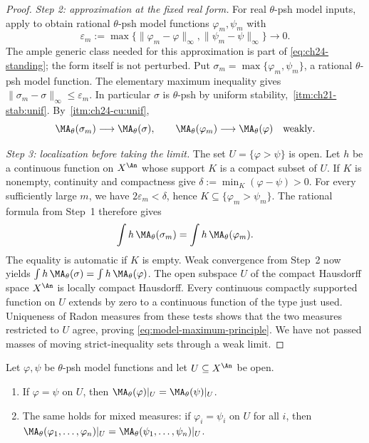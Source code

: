\begin{proof}
\emph{Step 2: approximation at the fixed real form.}
For real \(\theta\)-psh model inputs, apply
 to obtain rational
\(\theta\)-psh model functions \(\varphi_m,\psi_m\) with
\[
 \varepsilon_m:=\max\{\|\varphi_m-\varphi\|_\infty,
                         \|\psi_m-\psi\|_\infty\}\longrightarrow0.
\]
The ample generic class needed for this approximation is part of
\eqref{eq:ch24-standing}; the form itself is not perturbed.
Put \(\sigma_m=\max\{\varphi_m,\psi_m\}\), a rational
\(\theta\)-psh model function.  The elementary maximum inequality gives
\(\|\sigma_m-\sigma\|_\infty\leq\varepsilon_m\).
In particular \(\sigma\) is \(\theta\)-psh by uniform stability,
\,\cref{itm:ch21-stab:unif}.
By \,\cref{itm:ch24-cu:unif},
\[
 \MA_\theta(\sigma_m)\longrightarrow\MA_\theta(\sigma),
 \qquad
 \MA_\theta(\varphi_m)\longrightarrow\MA_\theta(\varphi)
 \quad\text{weakly}.
\]

\emph{Step 3: localization before taking the limit.}
The set \(U=\{\varphi>\psi\}\) is open.  Let \(h\) be a continuous
function on \(X^{\An}\) whose support \(K\) is a compact subset of
\(U\).  If \(K\) is nonempty, continuity and compactness give
\(\delta:=\min_K(\varphi-\psi)>0\).  For every sufficiently large
\(m\), we have \(2\varepsilon_m<\delta\), hence
\(K\subseteq\{\varphi_m>\psi_m\}\).  The rational formula from
Step~1 therefore gives
\[
 \int h\,\MA_\theta(\sigma_m)
       =\int h\,\MA_\theta(\varphi_m).
\]
The equality is automatic if \(K\) is empty.  Weak convergence from
Step~2 now yields
\(\int h\,\MA_\theta(\sigma)=\int h\,\MA_\theta(\varphi)\).
The open subspace \(U\) of the compact Hausdorff space \(X^{\An}\)
is locally compact Hausdorff.  Every continuous compactly supported
function on \(U\) extends by zero to a continuous function of the type
just used.  Uniqueness of Radon measures from these tests shows that the
two measures restricted to \(U\) agree, proving
\eqref{eq:model-maximum-principle}.  We have not passed masses of moving
strict-inequality sets through a weak limit.
\end{proof}

\begin{corollary}
\label{cor:ch24-model-locality-open}
Let \(\varphi,\psi\) be \(\theta\)-psh model functions and let
\(U\subseteq X^{\An}\) be open.
\begin{enumerate}
\item\label{itm:ch24-mlo:agree} If \(\varphi=\psi\) on \(U\), then
 \(\MA_\theta(\varphi)|_U=\MA_\theta(\psi)|_U\).
\item\label{itm:ch24-mlo:mixed} The same holds for mixed measures: if
 \(\varphi_i=\psi_i\) on \(U\) for all \(i\), then
 \(\MA_\theta(\varphi_1,\ldots,\varphi_n)|_U
   =\MA_\theta(\psi_1,\ldots,\psi_n)|_U\).
\end{enumerate}
\end{corollary}

